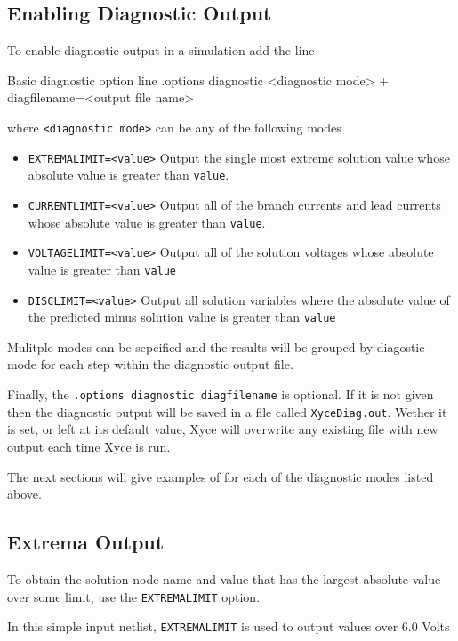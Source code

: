 \subsection{Enabling Diagnostic Output}
To enable diagnostic output in a simulation add the line
\begin{NetlistFigure}{Basic diagnostic option line}
.options diagnostic <diagnostic mode> 
+ diagfilename=<output file name>
\end{NetlistFigure}
where \texttt{<diagnostic mode>} can be any of the following modes
\begin{itemize}
  \item \texttt{EXTREMALIMIT=<value>}  Output the single most extreme solution value 
    whose absolute value is greater than \texttt{value}.
  \item \texttt{CURRENTLIMIT=<value>}  Output all of the branch currents and lead currents  
    whose absolute value is greater than \texttt{value}.
  \item \texttt{VOLTAGELIMIT=<value>}  Output all of the solution voltages  
    whose absolute value is greater than \texttt{value}
  \item \texttt{DISCLIMIT=<value>}  Output all solution variables where the absolute value
    of the predicted minus solution value is greater than \texttt{value}
\end{itemize}
Mulitple modes can be sepcified and the results will be grouped by diagostic mode for 
each step within the diagnostic output file.

Finally, the \texttt{.options diagnostic diagfilename} is optional.  If it is not given then 
the diagnostic output will be saved in a file called \texttt{XyceDiag.out}.  Wether it 
is set, or left at its default value, Xyce will overwrite any existing file with new 
output each time Xyce is run.  

The next sections will give examples of for each of the diagnostic modes listed above.

\subsection{Extrema Output}
To obtain the solution node name and value that has the largest absolute value over some 
limit, use the \texttt{EXTREMALIMIT} option. 

In this simple \Xyce{} input netlist, \texttt{EXTREMALIMIT} is used to output values over 6.0 Volts

